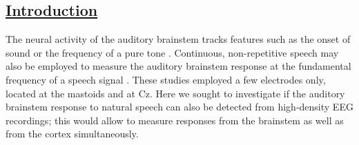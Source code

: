 \documentclass[a0,landscape]{a0poster}
\begin{document}


\begin{multicols*}{3} %

\section*{\underline{Introduction}}
\begin{flushleft}
\normalsize
The neural activity of the auditory brainstem tracks features such as the onset of sound or the frequency of a pure tone \cite{Skoe2010}. 
Continuous, non-repetitive speech may also be employed to measure the auditory brainstem response at the fundamental frequency of a speech signal \cite{Reichenbach2016,Forte2017b}.
These studies employed a few electrodes only, located at the mastoids and at Cz. Here we sought to investigate if the auditory brainstem response to natural speech can also be detected from high-density EEG recordings; this would allow to measure responses from the brainstem as well as from the cortex simultaneously.
\end{flushleft}



\end{multicols*}
\end{document}
